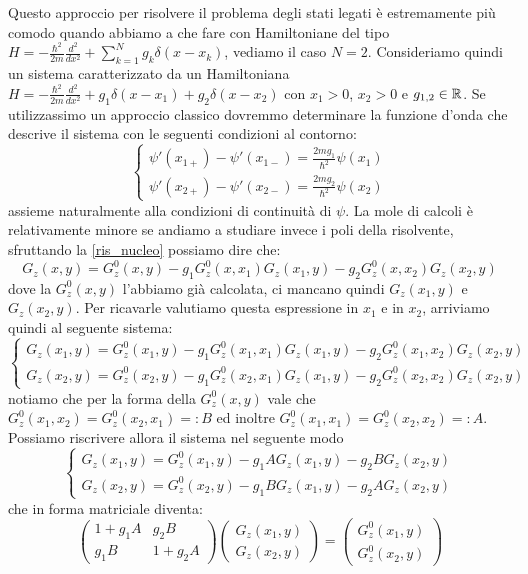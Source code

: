 Questo approccio per risolvere il problema degli stati legati è estremamente più comodo quando abbiamo a che fare con Hamiltoniane del tipo $H = -\frac{\hbar^2}{2m}\frac{d^2}{dx^2} + \sum_{k=1}^N g_k\delta(x-x_k)$, vediamo il caso $N=2$. Consideriamo quindi un sistema caratterizzato da un Hamiltoniana $H = -\frac{\hbar^2}{2m}\frac{d^2}{dx^2} +g_1\delta(x-x_1)+g_2\delta(x-x_2)$ con $x_1>0$, $x_2>0$ e $g_{1,2}\in\mathbb{R}$. Se utilizzassimo un approccio classico dovremmo determinare la funzione d'onda che descrive il sistema con le seguenti condizioni al contorno:
\[\begin{cases}
\psi'(x_{1+}) - \psi'(x_{1-}) = \frac{2mg_1}{\hbar^2}\psi(x_1)\\
\psi'(x_{2+}) - \psi'(x_{2-}) = \frac{2mg_2}{\hbar^2}\psi(x_2)
\end{cases}\]
assieme naturalmente alla condizioni di continuità di $\psi$. La mole di calcoli è relativamente minore se andiamo a studiare invece i poli della risolvente, sfruttando la \eqref{ris_nucleo} possiamo dire che:
\[G_z(x,y) = G_z^0(x,y) - g_1G_z^0(x,x_1)G_z(x_1,y) - g_2G_z^0(x,x_2)G_z(x_2,y) \]
dove la $G_z^0(x,y)$ l'abbiamo già calcolata, ci mancano quindi $G_z(x_1,y)$ e $G_z(x_2,y)$. Per ricavarle valutiamo questa espressione in $x_1$ e in $x_2$, arriviamo quindi al seguente sistema:
\[\begin{cases}
G_z(x_1,y) = G_z^0(x_1,y) - g_1G_z^0(x_1,x_1)G_z(x_1,y) - g_2G_z^0(x_1,x_2)G_z(x_2,y)\\
G_z(x_2,y) = G_z^0(x_2,y) - g_1G_z^0(x_2,x_1)G_z(x_1,y) - g_2G_z^0(x_2,x_2)G_z(x_2,y)
\end{cases}\]
notiamo che per la forma della $G_z^0(x,y)$ vale che $G_z^0(x_1,x_2) = G_z^0(x_2,x_1) =: B $ ed inoltre $G_z^0(x_1,x_1)=G_z^0(x_2,x_2)=:A$. Possiamo riscrivere allora il sistema nel seguente modo
\[\begin{cases}
G_z(x_1,y) = G_z^0(x_1,y) - g_1AG_z(x_1,y) - g_2BG_z(x_2,y)\\
G_z(x_2,y) = G_z^0(x_2,y) - g_1BG_z(x_1,y) - g_2AG_z(x_2,y)
\end{cases}\]
che in forma matriciale diventa:
\[\begin{pmatrix}
1+g_1A & g_2B\\
g_1B & 1+g_2A
\end{pmatrix}
\begin{pmatrix}
G_z(x_1,y)\\
G_z(x_2,y)
\end{pmatrix}=
\begin{pmatrix}
G_z^0(x_1,y)\\
G_z^0(x_2,y)
\end{pmatrix}
\]
